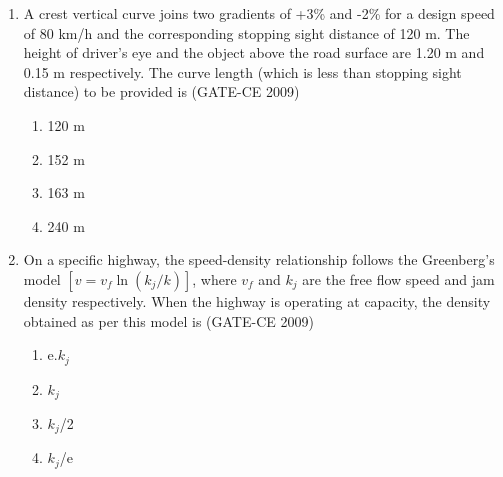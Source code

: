 \documentclass[12pt]{article}
\begin{document}
\begin{enumerate}[label=Q.\arabic*]
    \item A crest vertical curve joins two gradients of +3\% and -2\% for a design speed of 80 km/h and the corresponding stopping sight distance of 120 m. The height of driver's eye and the object above the road surface are 1.20 m and 0.15 m respectively. The curve length (which is less than stopping sight distance) to be provided is (GATE-CE 2009)
    \begin{enumerate}[label=(\Alph*)]
        \item 120 m 
        \item 152 m 
        \item 163 m 
        \item 240 m
    \end{enumerate}
    
    \item On a specific highway, the speed-density relationship follows the Greenberg's model $[v = v_f \ln(k_j / k)]$, where $v_f$ and $k_j$ are the free flow speed and jam density respectively. When the highway is operating at capacity, the density obtained as per this model is (GATE-CE 2009)
    \begin{enumerate}[label=(\Alph*)]
        \item e.$k_j$ 
        \item $k_j$ 
        \item $k_j$/2 
        \item $k_j$/e
    \end{enumerate}
    

\end{enumerate}
\end{document}
